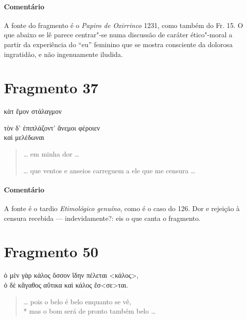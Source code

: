 {{\paragraph{Comentário} A fonte do fragmento é o \textit{Papiro de Oxirrinco} 1231, como também do Fr.
15. O que abaixo se lê parece centrar"-se numa discussão de caráter ético"-moral
a partir da experiência do “eu” feminino que se mostra consciente da dolorosa
ingratidão, e não ingenuamente iludida.}



\pagebreak
\section{Fragmento 37}

\begin{gkverse}
κὰτ ἔμον στάλαγμον

\ast\quad\ast\quad\ast

τὸν δ’ ἐπιπλάζοντ’ ἄνεμοι φέροιεν\\
      καὶ μελέδωναι
\end{gkverse}

\begin{verse}
\ldots{} em minha dor \ldots{}

\ast\quad\ast\quad\ast

\ldots{} que ventos e anseios carreguem a ele que me censura \ldots{}
\end{verse}

{\paragraph{Comentário} A fonte é o tardio \textit{Etimológico genuíno}, como é o caso do 126. Dor e
rejeição à censura recebida --- indevidamente?: eis o que canta o fragmento.}


\section{Fragmento 50}

\begin{gkverse}
ὀ μὲν γὰρ κάλος ὄσσον ἴδην πέλεται <κάλος>,\\
ὀ δὲ κἄγαθος αὔτικα καὶ κάλος ἔσ<σε>ται.
\end{gkverse}

\begin{verse}
\ldots{} pois o belo é belo enquanto se vê,\\*
mas o bom será de pronto também belo \ldots{}
\end{verse}

}
